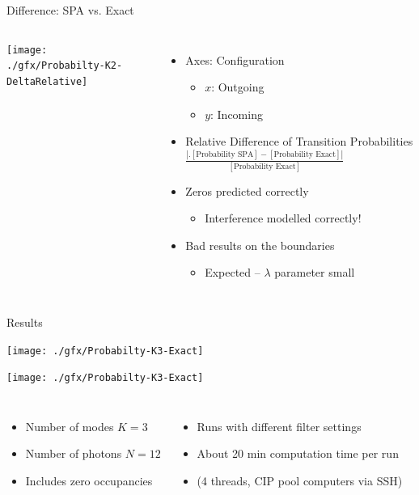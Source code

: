\begin{frame}{Difference: SPA vs. Exact}
%
\begin{columns}
	\texttt{[image: ./gfx/Probabilty-K2-DeltaRelative]}
%
	\begin{itemize}
	\item Axes: Configuration
		\begin{itemize}
		\item $x$: Outgoing
		\item $y$: Incoming
		\end{itemize}
	\item Relative Difference of Transition Probabilities
		$
			\frac
				{\left| \big. [\text{Probability SPA}] - [\text{Probability Exact}] \right|}
				{[\text{Probability Exact}]}
		$
	\item Zeros predicted correctly
		\begin{itemize}
		\item[\Thus] Interference modelled correctly!
		\end{itemize}
	\item Bad results on the boundaries
		\begin{itemize}
		\item Expected -- $\lambda$ parameter small
		\end{itemize}
	\end{itemize}
\end{columns}
%
\end{frame}


\begin{frame}{Results}
%
\begin{minipage}{.49\linewidth}
	\texttt{[image: ./gfx/Probabilty-K3-Exact]}
\end{minipage}
%
\begin{minipage}{.49\linewidth}
	\texttt{[image: ./gfx/Probabilty-K3-Exact]}
\end{minipage}
%
\begin{columns}[t]
\begin{itemize}
\item Number of modes $K = 3$
\item Number of photons $N = 12$
\item Includes zero occupancies
\end{itemize}
%
\begin{itemize}
\item Runs with different filter settings
\item About 20 min computation time per run
\item (4 threads, CIP pool computers via SSH)
\end{itemize}
\end{columns}
%
\end{frame}

